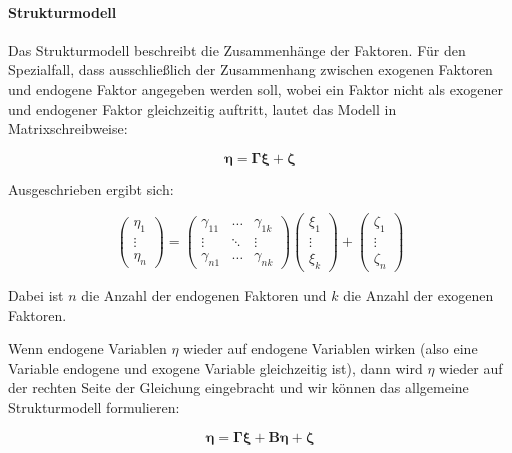 \documentclass{article}
\numberwithin{equation}{section}
\begin{document}
\paragraph*{Strukturmodell}

Das Strukturmodell beschreibt die Zusammenhänge der Faktoren. Für den Spezialfall, dass ausschließlich der Zusammenhang zwischen exogenen Faktoren und endogene Faktor angegeben werden soll, wobei ein Faktor nicht als exogener und endogener Faktor gleichzeitig auftritt, lautet das Modell in Matrixschreibweise:

\begin{equation}
\boldsymbol\eta = \boldsymbol{\Gamma \xi} + \boldsymbol\zeta
\end{equation}

Ausgeschrieben ergibt sich:

\begin{equation}
\begin{pmatrix}\eta_1\\ \vdots\\ \eta_n\end{pmatrix} = 
\begin{pmatrix}\gamma_{11} & \hdots & \gamma_{1k}\\ \vdots & \ddots & \vdots \\ \gamma_{n1} & \hdots & \gamma_{nk} \end{pmatrix}
\begin{pmatrix}\xi_1\\ \vdots\\ \xi_k\end{pmatrix} +
\begin{pmatrix}\zeta_1\\ \vdots\\ \zeta_n\end{pmatrix}
\end{equation}

Dabei ist $n$ die Anzahl der endogenen Faktoren und $k$ die Anzahl der exogenen Faktoren.

Wenn endogene Variablen $\eta$ wieder auf endogene Variablen wirken (also eine Variable endogene und exogene Variable gleichzeitig ist), dann wird $\eta$ wieder auf der rechten Seite der Gleichung eingebracht und wir können das allgemeine Strukturmodell formulieren:

\begin{equation}
\label{eq:structmodel}
\boldsymbol\eta = \boldsymbol{\Gamma \xi} + \boldsymbol{B \eta} + \boldsymbol\zeta
\end{equation}
\end{document}
